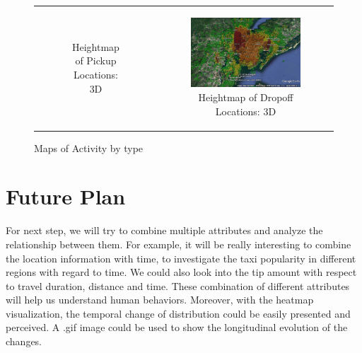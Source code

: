\documentclass{article}
\begin{document}
\begin{figure}
\begin{tabular}{cc}
\begin{subfigure}{.5\linewidth}
  \caption{Heightmap of Pickup Locations: 3D}
  \label{sub:pu_ne}%
\end{subfigure} &
\begin{subfigure}{.5\linewidth}
  \centering
  \includegraphics[width=.8\linewidth]{dropoff_ne.jpg}
  \caption{Heightmap of Dropoff Locations: 3D}
  \label{sub:do_ne}
\end{subfigure} \\ 

\end{tabular}
\label{fig:heatmap}
\caption{Maps of Activity by type}
\end{figure}

\section{Future Plan}
For next step, we will try to combine multiple attributes and analyze the relationship between them. For example, it will be really interesting to combine the location information with time, to investigate the taxi popularity in different regions with regard to time. We could also look into the tip amount with respect to travel duration, distance and time. These combination of different attributes will help us understand human behaviors. Moreover, with the heatmap visualization, the temporal change of distribution could be easily presented and perceived. A .gif image could be used to show the longitudinal evolution of the changes. 

\vfill

\medskip


\end{document}
